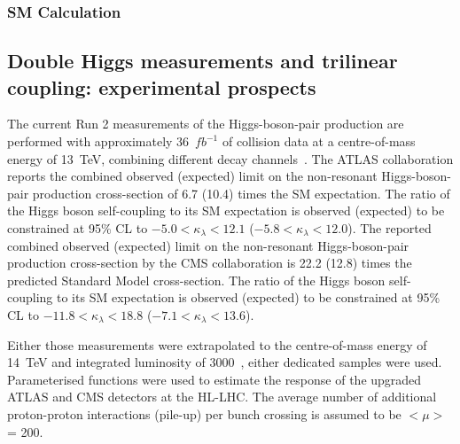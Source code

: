 \documentclass[../report.tex]{subfiles}
\begin{document}
\subsubsection{SM Calculation}










\subsection{Double Higgs measurements and trilinear coupling: experimental prospects}
\label{sec:HH_meas_exp}

The current Run 2 measurements of the Higgs-boson-pair production are performed with approximately 36~$fb^{-1}$ of collision data at a centre-of-mass energy of 13~TeV, combining different decay channels~\cite{ATLAS-CONF-2018-043, Sirunyan:2018two}. 
The ATLAS collaboration reports the combined observed (expected) limit on the non-resonant Higgs-boson-pair production cross-section of 6.7 (10.4) times the SM expectation. The ratio of the Higgs boson self-coupling to its SM expectation is observed (expected) to be constrained at 95\% CL to $-5.0<\kappa_{\lambda}<12.1$ ($-5.8<\kappa_{\lambda}<12.0$). 
The reported combined observed (expected) limit on the non-resonant Higgs-boson-pair production cross-section by the CMS collaboration is 22.2 (12.8) times the predicted Standard Model cross-section. The ratio of the Higgs boson self-coupling to its SM expectation is observed (expected) to be constrained at 95\% CL to $-11.8<\kappa_{\lambda}<18.8$ ($-7.1<\kappa_{\lambda}<13.6$). 

Either those measurements were extrapolated to the centre-of-mass energy of 14~TeV and integrated luminosity of 3000~\ifb, either dedicated samples were used. Parameterised functions were used to estimate the response of the upgraded ATLAS and CMS detectors at the HL-LHC. The average number of additional proton-proton interactions (pile-up) per bunch crossing is assumed to be $<\mu>$ = 200.
\end{document}
